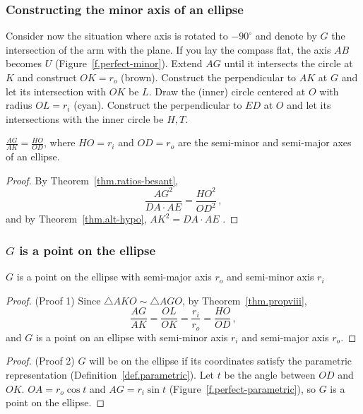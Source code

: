 
\subsubsection*{Constructing the minor axis of an ellipse}

Consider now the situation where axis is rotated to $-90^\circ$ and denote by $G$ the intersection of the arm with the plane. If you lay the compass flat, the axis $AB$ becomes $U$ (Figure~\ref{f.perfect-minor}). Extend $AG$ until it intersects the circle at $K$ and construct $OK=r_o$ (brown). Construct the perpendicular to $AK$ at $G$ and let its intersection with $OK$ be $L$. Draw the (inner) circle centered at $O$ with radius $OL=r_i$ (cyan). Construct the perpendicular to $ED$ at $O$ and let its intersections with the inner circle be $H,T$.

\begin{theorem}\label{thm.propviii}
$\displaystyle\frac{AG}{AK}=\frac{HO}{OD}$, where $HO=r_i$ and $OD=r_o$ are the semi-minor and semi-major axes of an ellipse.
\end{theorem}
\begin{proof}
By Theorem~\ref{thm.ratios-besant},
\[
\frac{AG^2}{DA\cdot AE} = \frac{HO^2}{OD^2}\,,
\]
and by Theorem~\ref{thm.alt-hypo}, $AK^2=DA\cdot AE$ .\hqed
\end{proof}

\subsubsection*{$G$ is a point on the ellipse}

\begin{theorem}
$G$ is a point on the ellipse with semi-major axis $r_o$ and semi-minor axis $r_i$
\end{theorem}
\begin{proof}(Proof 1)
Since $\triangle AKO \sim \triangle AGO$, by Theorem~\ref{thm.propviii},
\[
\frac{AG}{AK}=\frac{OL}{OK}=\frac{r_i}{r_o}=\frac{HO}{OD}\,,
\]
and $G$ is a point on an ellipse with semi-minor axis $r_i$ and semi-major axis $r_o$.\hqed
\end{proof}


\begin{proof}(Proof 2)
$G$ will be on the ellipse if its coordinates satisfy the parametric representation (Definition~\ref{def.parametric}). Let $t$ be the angle between $OD$ and $OK$. $OA=r_o\cos t$ and $AG=r_i\sin t$ (Figure~\ref{f.perfect-parametric}), so $G$ is a point on the ellipse. \hqed
\end{proof}

